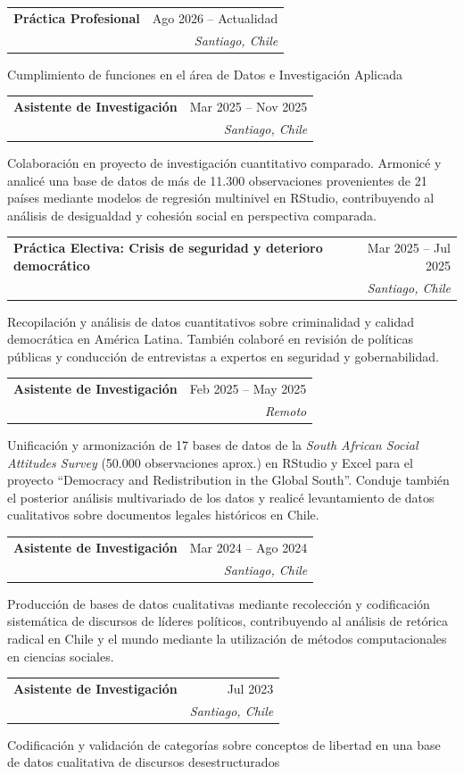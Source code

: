 \documentclass[a4paper,10pt]{article}
\makeatletter
\newcommand{\experience}[5]{%
    \par\noindent\begin{minipage}{\linewidth}%
        \renewcommand{\arraystretch}{0.92}%
        \begin{tabularx}{\linewidth}{@{}>{\raggedright\arraybackslash}X@{\hspace{1em}}r@{}}%
            \textbf{#1} & {#2}\\
            {\itshape #3} & {\itshape #4}%
        \end{tabularx}\par
        #5%
    \end{minipage}\par\addvspace{2pt}%
}
\makeatother
\begin{document}
\experience{Práctica Profesional}{Ago 2026 -- Actualidad}{\href{https://pazciudadana.cl/}{Fundación Paz Ciudadana}}{Santiago, Chile}{
    Cumplimiento de funciones en el área de Datos e Investigación Aplicada
}

\experience{Asistente de Investigación}{Mar 2025 -- Nov 2025}{\href{https://coes.cl/}{Centro de Estudios de Conflicto y Cohesión Social (COES)}}{Santiago, Chile}{
    Colaboración en proyecto de investigación cuantitativo comparado. Armonicé y analicé una base de datos de más de 11.300 observaciones provenientes de 21 países mediante modelos de regresión multinivel en RStudio, contribuyendo al análisis de desigualdad y cohesión social en perspectiva comparada.
}

\experience{Práctica Electiva: Crisis de seguridad y deterioro democrático}{Mar 2025 -- Jul 2025}{\href{https://transformacionessociales.udp.cl/}{Laboratorio de Transformaciones Sociales, UDP}}{Santiago, Chile}{
    Recopilación y análisis de datos cuantitativos sobre criminalidad y calidad democrática en América Latina. También colaboré en revisión de políticas públicas y conducción de entrevistas a expertos en seguridad y gobernabilidad.
}

\experience{Asistente de Investigación}{Feb 2025 -- May 2025}{\href{https://www.snis.ch/projects-details/2022-lopez/r/MQbwcMvWiz1JwP}{Swiss Network for International Studies} (Geneva Graduate Institute)}{Remoto}{
    Unificación y armonización de 17 bases de datos de la \textit{South African Social Attitudes Survey} (50.000 observaciones aprox.) en RStudio y Excel para el proyecto ``Democracy and Redistribution in the Global South''. Conduje también el posterior análisis multivariado de los datos y realicé levantamiento de datos cualitativos sobre documentos legales históricos en Chile.
}

\experience{Asistente de Investigación}{Mar 2024 -- Ago 2024}{Laboratorio para el Estudio de la Radicalización Política, UDP}{Santiago, Chile}{
    Producción de bases de datos cualitativas mediante recolección y codificación sistemática de discursos de líderes políticos, contribuyendo al análisis de retórica radical en Chile y el mundo mediante la utilización de métodos computacionales en ciencias sociales.
}

\experience{Asistente de Investigación}{Jul 2023}{\href{https://mepop.cl/}{Núcleo Milenio para el Estudio de la Política, Opinión Pública y Medios en Chile}}{Santiago, Chile}{
    Codificación y validación de categorías sobre conceptos de libertad en una base de datos cualitativa de discursos desestructurados
}
\end{document}
